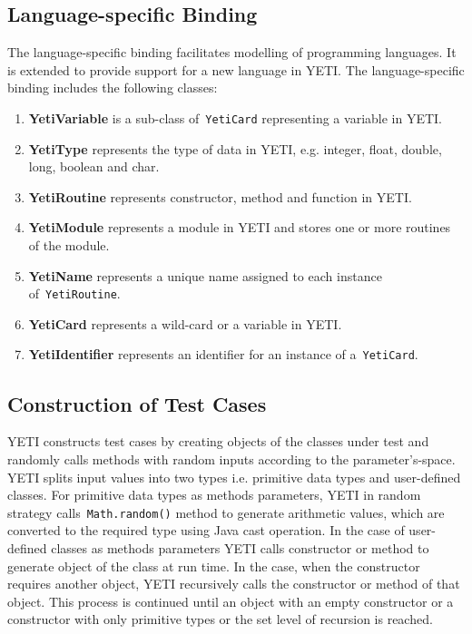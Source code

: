 \subsection{Language-specific Binding}
The language-specific binding facilitates modelling of programming languages. It is extended to provide support for a new language in YETI. The language-specific binding includes the following classes:
\begin{enumerate}
\item {\textbf{YetiVariable}} is a sub-class of~\verb+YetiCard+ representing a variable in YETI.
\item {\textbf{YetiType}} represents the type of data in YETI, e.g. integer, float, double, long, boolean and char.
\item {\textbf{YetiRoutine}} represents constructor, method and function in YETI. 
\item {\textbf{YetiModule}} represents a module in YETI and stores one or more routines of the module.
\item {\textbf{YetiName}} represents a unique name assigned to each instance of~\verb+YetiRoutine+.
\item {\textbf{YetiCard}} represents a wild-card or a variable in YETI.
\item {\textbf{YetiIdentifier}} represents an identifier for an instance of a~\verb+YetiCard+.
\end{enumerate}

\subsection{Construction of Test Cases} \label{sec:constructionOfTestCases}
YETI constructs test cases by creating objects of the classes under test and randomly calls methods with random inputs according to the parameter's-space. YETI splits input values into two types i.e. primitive data types and user-defined classes. For primitive data types as methods parameters, YETI in random strategy calls~\verb+Math.random()+ method to generate arithmetic values, which are converted to the required type using Java cast operation. In the case of user-defined classes as methods parameters YETI calls constructor or method to generate object of the class at run time. In the case, when the constructor requires another object, YETI recursively calls the constructor or method of that object. This process is continued until an object with an empty constructor or a constructor with only primitive types or the set level of recursion is reached.

